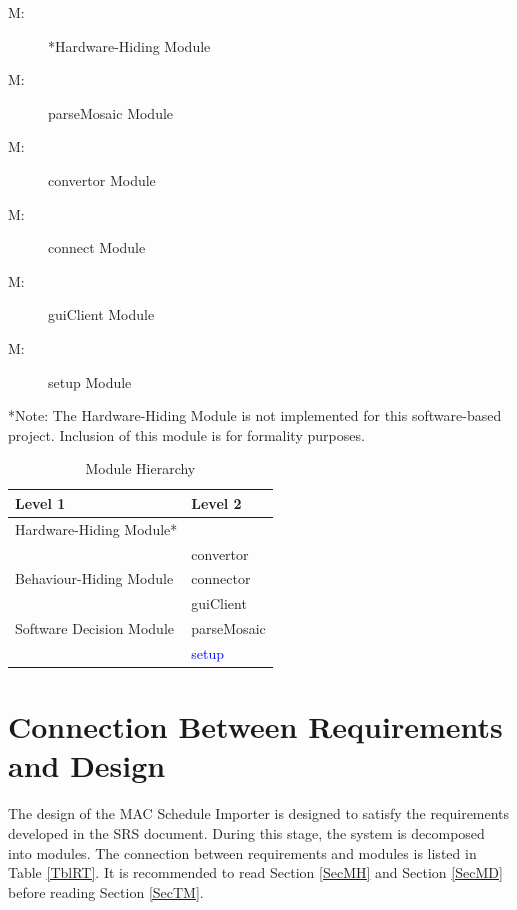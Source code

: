 \documentclass[12pt, titlepage]{article}
\newcounter{mnum}
\newcommand{\mthemnum}{M\themnum}
\begin{document}
\begin{description}
\item [ \mthemnum \label{mHH}:] *Hardware-Hiding Module
\item [ \mthemnum \label{mpM}:] parseMosaic Module
\item [ \mthemnum \label{mcv}:] convertor Module
\item [ \mthemnum \label{mcn}:] connect Module
\item [ \mthemnum \label{mgc}:] guiClient Module
\color{blue}
\item [ \mthemnum \label{mst}:] setup Module
\color{black}
\end{description}

*Note: The Hardware-Hiding Module is not implemented for this software-based project. Inclusion of this module is for formality purposes.

\begin{table}[h!]
\centering
\begin{tabular}{p{} p{}}
\toprule
\textbf{Level 1} & \textbf{Level 2}\\
\midrule

{Hardware-Hiding Module*} & ~ \\
\midrule

\multirow{3}{0.3\textwidth}{Behaviour-Hiding Module} & convertor\\
& connector\\
& guiClient\\
\midrule

\multirow{1}{0.3\textwidth}{Software Decision Module} & parseMosaic\\
& \textcolor{blue}{setup}\\
\bottomrule

\end{tabular}
\caption{Module Hierarchy}
\label{TblMH}
\end{table}

\section{Connection Between Requirements and Design} \label{SecConnection}

The design of the MAC Schedule Importer is designed to satisfy the requirements developed in
the SRS document. During this stage, the system is decomposed into modules. The connection
between requirements and modules is listed in Table \ref{TblRT}. It is recommended to read Section \ref{SecMH} and Section \ref{SecMD} before reading Section \ref{SecTM}.\\
\end{document}
